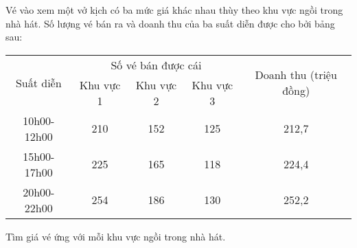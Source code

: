 \begin{bt}
	Vé vào xem một vở kịch có ba mức giá khác nhau thùy theo khu vực ngồi trong nhà hát. Số lượng vé bán ra và doanh thu của ba suất diễn được cho bởi bảng sau: 
	\begin{center}
		\begin{tabular}{|c|c|c|c|c|}
			\hline
			\multirow{2}{*}{Suất diễn }&\multicolumn{3}{c|}{Số vé bán được cái}&\multirow{2}{*}{Doanh thu (triệu đồng)}\\ \cline{2-4}
			& Khu vực 1 & Khu vực 2 & Khu vực 3&  \\ \hline
			10h00-12h00 & 210 & 152 & 125 &212,7 \\ \hline
			15h00-17h00 & 225 & 165 & 118 &224,4 \\ \hline
			20h00-22h00 &254 &186 & 130 &252,2 \\ \hline
		\end{tabular}
	\end{center}
	Tìm giá vé ứng với mỗi khu vực ngồi trong nhà hát.
\end{bt}

